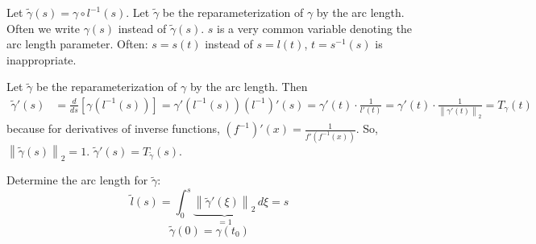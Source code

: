\documentclass{article}
\newcommand{\norm}[1]{\left\|#1\right\|}
\begin{document}
Let $\tilde\gamma(s) = \gamma \circ l^{-1}(s)$. Let $\tilde\gamma$ be the reparameterization of $\gamma$ by the arc length. Often we write $\gamma(s)$ instead of $\tilde\gamma(s)$. $s$ is a very common variable denoting the arc length parameter.
Often: $s = s(t)$ instead of $s = l(t)$, $t = s^{-1}(s)$ is inappropriate.

Let $\tilde\gamma$ be the reparameterization of $\gamma$ by the arc length. Then
\begin{align*}
  \tilde\gamma'(s) &= \frac d{ds} [\gamma(l^{-1}(s))]
    = \gamma' (l^{-1}(s)) (l^{-1})'(s)
    = \gamma' (t) \cdot \frac{1}{l'(t)}
    = \gamma' (t) \cdot \frac{1}{\norm{\gamma'(t)}_2} = T_{\gamma}(t)
\end{align*}
because for derivatives of inverse functions, $(f^{-1})'(x) = \frac{1}{f'(f^{-1}(x))}$.
So, $\norm{\tilde\gamma(s)}_2 = 1$. $\tilde\gamma'(s) = T_{\tilde\gamma}(s)$.

Determine the arc length for $\tilde\gamma$:
\[ \tilde l(s) = \int_0^s \underbrace{\norm{\tilde\gamma'(\xi)}_2}_{= 1} \, d\xi = s \]
\[ \tilde\gamma(0) = \gamma(t_0) \]
\end{document}
